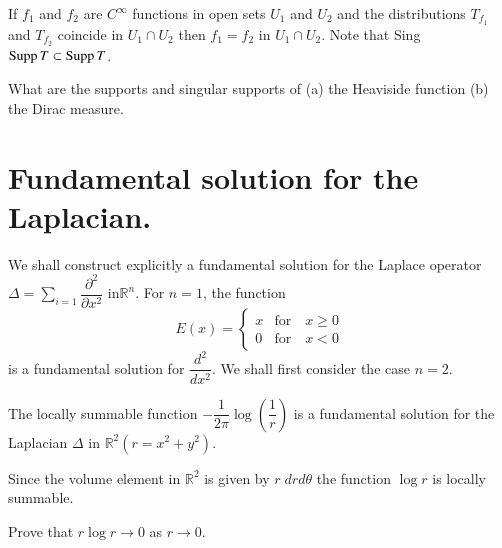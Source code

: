 \begin{lemma*}
If $f_{1}$ and $f_{2}$ are $C^{\infty}$ functions in open sets $U_{1}$ and $U_{2}$ and the distributions $T_{f_{1}}$ and $T_{f_{2}}$ coincide in $U_{1}\cap U_{2}$ then $f_{1}=f_{2}$ in $U_{1}\cap U_{2}$. Note that Sing $\operatorname{Supp} T\subset \operatorname{Supp} T$.
\end{lemma*}

\begin{exer*}
What are the supports and singular supports of (a) the Heaviside function (b) the Dirac measure.
\end{exer*}

\section*{Fundamental solution for the Laplacian.}

We shall construct explicitly a fundamental solution for the Laplace operator $\Delta =\sum\limits_{i=1}\dfrac{\partial^{2}}{\partial x^{2}}$ in\pageoriginale $\mathbb{R}^{n}$. For $n=1$, the function
$$
E(x)=
\begin{cases}
x &\text{for}\quad x\geq 0\\[3pt]
0 &\text{for}\quad x<0
\end{cases}
$$
is a fundamental solution for $\dfrac{d^{2}}{dx^{2}}$. We shall first consider the case $n=2$. 

\begin{theorem}\label{chap3-thm2}
The locally summable function $-\dfrac{1}{2\pi}\log \left(\dfrac{1}{r}\right)$ is a fundamental solution for the Laplacian $\Delta$ in $\mathbb{R}^{2}(r=x^{2}+y^{2})$.
\end{theorem}

\begin{remark*}
Since the volume element in $\mathbb{R}^{2}$ is given by $r\;drd \theta$ the function $\log r$ is locally summable.
\end{remark*}

\begin{exer*}
Prove that $r\log r\to 0$ as $r\to 0$.
\end{exer*}

